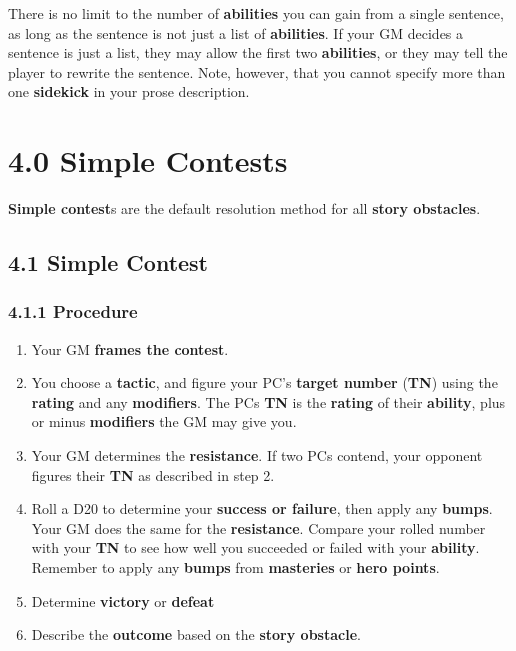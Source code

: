 \documentclass[
]{article}
\providecommand{\tightlist}{%
  \setlength{\itemsep}{0pt}\setlength{\parskip}{0pt}}
\begin{document}
There is no limit to the number of \textbf{abilities} you can gain from
a single sentence, as long as the sentence is not just a list of
\textbf{abilities}. If your GM decides a sentence is just a list, they
may allow the first two \textbf{abilities}, or they may tell the player
to rewrite the sentence. Note, however, that you cannot specify more
than one \textbf{sidekick} in your prose description.

\hypertarget{simple-contests}{%
\section{4.0 Simple Contests}\label{simple-contests}}

\textbf{Simple contest}s are the default resolution method for all
\textbf{story obstacles}.

\hypertarget{simple-contest-1}{%
\subsection{4.1 Simple Contest}\label{simple-contest-1}}

\hypertarget{procedure}{%
\subsubsection{4.1.1 Procedure}\label{procedure}}

\begin{enumerate}
\def\labelenumi{\arabic{enumi}.}
\tightlist
\item
  Your GM \textbf{frames the contest}.
\item
  You choose a \textbf{tactic}, and figure your PC's \textbf{target
  number} (\textbf{TN}) using the \textbf{rating} and any
  \textbf{modifiers}. The PCs \textbf{TN} is the \textbf{rating} of
  their \textbf{ability}, plus or minus \textbf{modifiers} the GM may
  give you.
\item
  Your GM determines the \textbf{resistance}. If two PCs contend, your
  opponent figures their \textbf{TN} as described in step 2.
\item
  Roll a D20 to determine your \textbf{success or failure}, then apply
  any \textbf{bumps}. Your GM does the same for the \textbf{resistance}.
  Compare your rolled number with your \textbf{TN} to see how well you
  succeeded or failed with your \textbf{ability}. Remember to apply any
  \textbf{bumps} from \textbf{masteries} or \textbf{hero points}.
\item
  Determine \textbf{victory} or \textbf{defeat}
\item
  Describe the \textbf{outcome} based on the \textbf{story obstacle}.
\end{enumerate}
\end{document}
